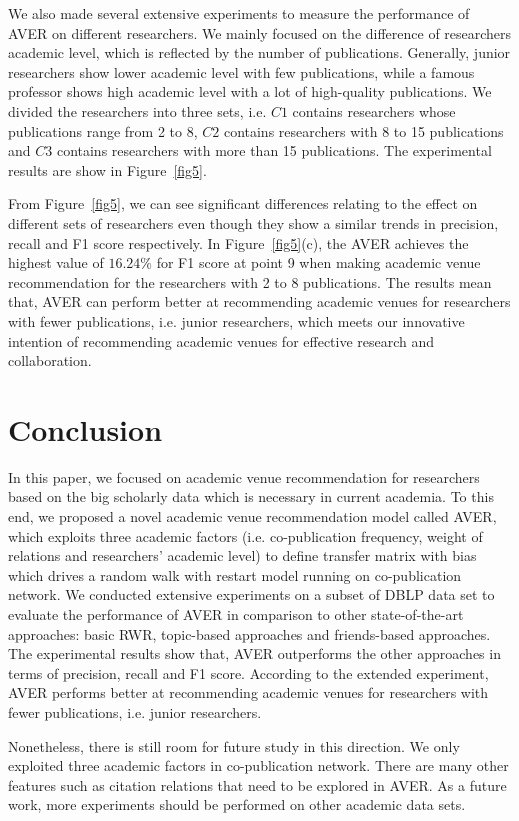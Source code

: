 \documentclass[9pt]{acm_proc_article-sp}
\begin{document}
We also made several extensive experiments to measure the performance of AVER on different researchers. We mainly focused on the difference of researchers academic level, which is reflected by the number of publications. Generally, junior researchers show lower academic level with few publications, while a famous professor shows high academic level with a lot of high-quality publications. We divided the researchers into three sets, i.e. $C1$ contains researchers whose publications range from 2 to 8, $C2$ contains researchers with 8 to 15 publications and $C3$ contains researchers with more than 15 publications. The experimental results are show in Figure~\ref{fig5}.

From Figure~\ref{fig5}, we can see significant differences relating to the effect on different sets of researchers even though they show a similar trends in precision, recall and F1 score respectively. In Figure~\ref{fig5}(c), the AVER achieves the  highest value of $16.24\%$ for F1 score at point 9 when making academic venue recommendation for the researchers with 2 to 8 publications. The results mean that, AVER can perform better at recommending academic venues for researchers with fewer publications, i.e. junior researchers, which meets our innovative intention of recommending academic venues for effective research and collaboration.

\section{Conclusion}
In this paper, we focused on academic venue recommendation for researchers based on the big scholarly data which is necessary in current academia. To this end, we proposed a novel academic venue recommendation model called AVER, which exploits three academic factors (i.e. co-publication frequency, weight of relations and researchers' academic level) to define transfer matrix with bias which drives a random walk with restart model running on co-publication network. We conducted extensive experiments on a subset of DBLP data set to evaluate the performance of AVER in comparison to other state-of-the-art approaches: basic RWR, topic-based approaches and friends-based approaches. The experimental results show that, AVER outperforms the other approaches in terms of precision, recall and F1 score. According to the extended experiment, AVER performs better at recommending academic venues for researchers with fewer publications, i.e. junior researchers.

Nonetheless, there is still room for future study in this direction. We only exploited three academic factors in co-publication network. There are many other features such as citation relations that need to be explored in AVER. As a future work, more experiments should be performed on other academic data sets.





\balancecolumns
\end{document}
